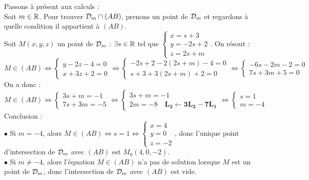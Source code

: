\documentclass[a4paper, 11pt,reqno]{article}
\begin{document}
\begin{correction}
\begin{enumerate}
Passons \`a pr\'esent aux calculs :\\
Soit $m \in \mathbb{R}$. Pour trouver ${\cal D}_m \cap (AB)$, prenons un point de ${\cal D}_m$ et regardons \`a quelle condition il appartient \`a $(AB)$.\\
Soit $M(x,y,z)$ un point de ${\cal D}_m$ : $\exists s \in \mathbb{R}$ tel que $\begin{cases} x = s+3 \\ y= -2s+2 \\ z = 2s+m\end{cases}$. On r\'esout :
$$ M \in (AB) \iff \begin{cases} y-2z-4 = 0 \\ x+3z+2 = 0 \end{cases} \iff \begin{cases} -2s+2-2(2s+m)-4 = 0 \\ s+3+3(2s+m)+2 = 0 \end{cases} \iff \begin{cases} -6s-2m-2 = 0 \\ 7s+3m+5= 0 \end{cases}$$
On a donc :
$$ M \in (AB)
\Leftrightarrow 
\begin{cases} 3s+m = -1 \\ 7s+3m= -5 \end{cases} 
\Leftrightarrow
\begin{cases} 3s+m = -1 \\ 2m= -8 \quad \mathbf{L_2\leftarrow 3L_2-7L_1}\end{cases} 
\Leftrightarrow
\begin{cases} s=1 \\ m= -4 \end{cases}$$
Conclusion :\\
$\bullet$ Si $m=-4$, alors $M \in (AB) \iff s=1 \iff \begin{cases} x=4\\y=0\\z=-2\end{cases}$, donc l'unique point d'intersection de ${\cal D}_m$ avec $(AB)$ est $M_0(4,0,-2)$.\\
$\bullet$ Si $m\neq -4$, alors l'\'equation $M \in (AB)$ n'a pas de solution lorsque $M$ est un point de ${\cal D}_m$, donc l'intersection de ${\cal D}_m$ avec $(AB)$ est vide.
\end{enumerate}
\end{correction}

\end{document}
